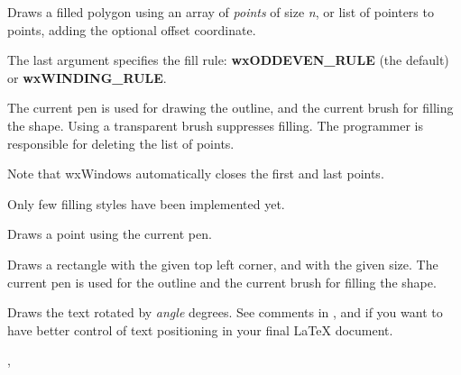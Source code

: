 Draws a filled polygon using an array of {\it points} of size {\it n},
or list of pointers to points, adding the optional offset coordinate.

The last argument specifies the fill rule: {\bf wxODDEVEN\_RULE} (the
default) or {\bf wxWINDING\_RULE}.

The current pen is used for drawing the outline, and the current brush
for filling the shape.  Using a transparent brush suppresses filling.
The programmer is responsible for deleting the list of points.

Note that wxWindows automatically closes the first and last points.

Only few filling styles have been implemented yet.


\label{wxlatexdcdrawpoint}


Draws a point using the current pen.

\label{wxlatexdcdrawrectangle}


Draws a rectangle with the given top left corner, and with the given
size.  The current pen is used for the outline and the current brush
for filling the shape.

\label{wxlatexdcdrawrotatedtext}


Draws the text rotated by {\it angle} degrees. See comments in , 
 and  if you want
to have better control of text positioning in your final LaTeX document.


, 

\label{wxlatexdcdrawroundedrectangle}


